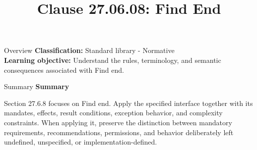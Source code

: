 \documentclass[10pt,letterpaper]{article}
\title{Clause 27.06.08: Find End}
\author{}
\date{}
\begin{document}
\maketitle
\begin{CornellOverviewBox}{Overview}
\textbf{Classification:} Standard library - Normative\\[2pt]
\textbf{Learning objective:} Understand the rules, terminology, and semantic consequences associated with Find end.
\end{CornellOverviewBox}\begin{CornellSummaryBox}{Summary}
{\sffamily\bfseries\color{Accent} Summary}\par\vspace{3pt}Section 27.6.8 focuses on Find end. Apply the specified interface together with its mandates, effects, result conditions, exception behavior, and complexity constraints. When applying it, preserve the distinction between mandatory requirements, recommendations, permissions, and behavior deliberately left undefined, unspecified, or implementation-defined.
\end{CornellSummaryBox}
\end{document}
